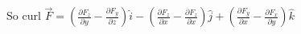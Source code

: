 \documentclass[preview]{standalone}
\begin{document}
\begin{center}
So curl $\vec{F} = (\frac{\partial F_{z}}{\partial y} - \frac{\partial F_{y}}{\partial z}) \hat{i} - (\frac{\partial F_{z}}{\partial x} - \frac{\partial F_{z}}{\partial x}) \hat{j} + (\frac{\partial F_{y}}{\partial x} - \frac{\partial F_{x}}{\partial y}) \hat{k}$
\end{center}
\end{document}
